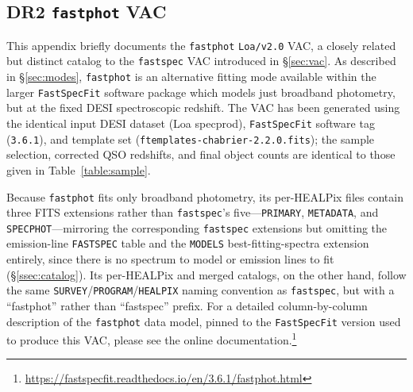 \documentclass[modern,linenumbers]{aastex701}
\newcommand{\fastspecfit}{\texttt{FastSpecFit}}
\newcommand{\fastspec}{\texttt{fastspec}}
\newcommand{\fastphot}{\texttt{fastphot}}
\begin{document}
\begin{appendix}

\section{DR2 \fastphot{} VAC}
\label{sec:appendix_fastphot}

This appendix briefly documents the \fastphot{} \texttt{Loa/v2.0} VAC,
a closely related but distinct catalog to the \fastspec{} VAC
introduced in \S\ref{sec:vac}. As described in \S\ref{sec:modes},
\fastphot{} is an alternative fitting mode available within the larger
\fastspecfit{} software package which models just broadband
photometry, but at the fixed DESI spectroscopic redshift. The VAC has
been generated using the identical input DESI dataset (Loa specprod),
\fastspecfit{} software tag (\texttt{3.6.1}), and template set
(\texttt{ftemplates-chabrier-2.2.0.fits}); the sample selection,
corrected QSO redshifts, and final object counts are identical to
those given in Table~\ref{table:sample}.

Because \fastphot{} fits only broadband photometry, its per-HEALPix
files contain three FITS extensions rather than \fastspec{}'s
five---\texttt{PRIMARY}, \texttt{METADATA}, and
\texttt{SPECPHOT}---mirroring the corresponding \fastspec{} extensions
but omitting the emission-line \texttt{FASTSPEC} table and the
\texttt{MODELS} best-fitting-spectra extension entirely, since there
is no spectrum to model or emission lines to fit
(\S\ref{ssec:catalog}). Its per-HEALPix and merged catalogs, on the
other hand, follow the same
\texttt{SURVEY}/\texttt{PROGRAM}/\texttt{HEALPIX} naming convention as
\fastspec, but with a ``fastphot'' rather than ``fastspec''
prefix. For a detailed column-by-column description of the \fastphot{}
data model, pinned to the \fastspecfit{} version used to produce this
VAC, please see the online
documentation.\footnote{\url{https://fastspecfit.readthedocs.io/en/3.6.1/fastphot.html}}


\end{appendix}
\end{document}
